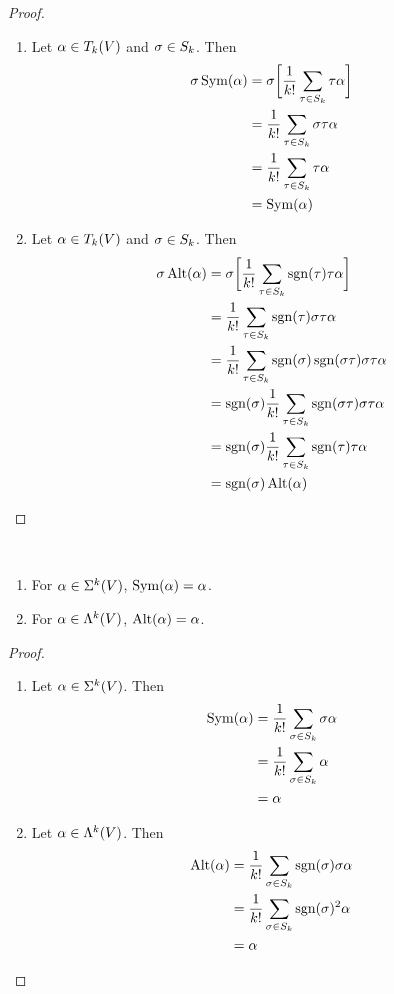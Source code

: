 \documentclass{book}
\begin{document}
	\begin{proof}\
		\begin{enumerate}
			\item Let $\alpha \in T_k(V)$ and $\sigma \in S_k$. Then 
			\begin{align*}
				\sigma \operatorname{Sym}(\alpha) 
				& = \sigma \bigg[ \frac{1}{k!}\sum_{\tau \in S_k} \tau \alpha \bigg]\\
				& = \frac{1}{k!} \sum_{\tau \in S_k} \sigma \tau \alpha \\
				& = \frac{1}{k!} \sum_{\tau \in S_k} \tau \alpha \\
				& = \operatorname{Sym}(\alpha)
			\end{align*} 
			\item Let $\alpha \in T_k(V)$ and $\sigma \in S_k$. Then 
			\begin{align*}
				\sigma \operatorname{Alt}(\alpha) 
				& = \sigma \bigg[ \frac{1}{k!}\sum_{\tau \in S_k} \operatorname{sgn}(\tau)\tau \alpha \bigg] \\
				& = \frac{1}{k!}\sum_{\tau \in S_k} \operatorname{sgn}(\tau) \sigma \tau \alpha \\
				& = \frac{1}{k!} \sum_{\tau \in S_k} \operatorname{sgn}(\sigma) \operatorname{sgn}(\sigma \tau) \sigma \tau \alpha \\
				& = \operatorname{sgn}(\sigma) \frac{1}{k!} \sum_{\tau \in S_k} \operatorname{sgn}(\sigma \tau) \sigma \tau \alpha \\
				& = \operatorname{sgn}(\sigma) \frac{1}{k!} \sum_{\tau \in S_k} \operatorname{sgn}(\tau)\tau \alpha \\
				& = \operatorname{sgn}(\sigma)\operatorname{Alt}(\alpha)
			\end{align*} 
		\end{enumerate}
	\end{proof}

	\begin{ex} \
		\begin{enumerate}
			\item For $\alpha \in \Sigma^k(V)$, $\operatorname{Sym}(\alpha) = \alpha$.
			\item For $\alpha \in \Lambda^k(V)$, $\operatorname{Alt}(\alpha) = \alpha$.
		\end{enumerate}
	\end{ex}

	\begin{proof}\
		\begin{enumerate}
			\item Let $\alpha \in \Sigma^k(V)$. Then 
			\begin{align*}
				\operatorname{Sym}(\alpha) 
				& = \frac{1}{k!} \sum_{\sigma \in S_k} \sigma \alpha \\
				& = \frac{1}{k!} \sum_{\sigma \in S_k} \alpha \\
				& = \alpha
			\end{align*}
			\item Let $\alpha \in \Lambda^k(V)$. Then 
			\begin{align*}
				\operatorname{Alt}(\alpha) 
				& = \frac{1}{k!} \sum_{\sigma \in S_k} \operatorname{sgn}(\sigma)\sigma \alpha \\
				& = \frac{1}{k!} \sum_{\sigma \in S_k} \operatorname{sgn}(\sigma)^2 \alpha \\
				& = \alpha
			\end{align*}
		\end{enumerate}
	\end{proof}
\end{document}
